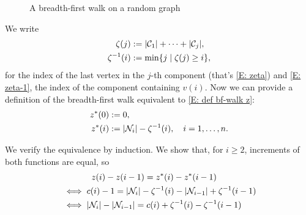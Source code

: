 \begin{figure}[H]
	\label{F: bf-walk}
	
	\centering
	\\
	
	\centering
	\\
	
	\centering
	
	\caption{A breadth-first walk on a random graph}
\end{figure} 


We write
\begin{align}
\zeta(j) &:= |\mathcal{C}_{1}| + \dots + |\mathcal{C}_{j}|, \label{E: zeta}\\ 
\zeta^{-1}(i) &:= \min \{ j \; | \; \zeta(j) \geq i \}, \label{E: zeta-1}
\end{align}
for the index of the last vertex in the $j$-th component (that's \eqref{E: zeta})
and \eqref{E: zeta-1}, the index of the component containing $v(i)$.
Now we can provide a definition of the breadth-first walk equivalent to \eqref{E: def bf-walk z}:
\begin{equation}  \label{E: def bf-walk z*}
\begin{aligned}
z^*(0) &:= 0, \\
z^*(i) &:= |\mathcal{N}_{i}| - \zeta^{-1}(i), \quad i=1, \dots , n.
\end{aligned}
\end{equation}

We verify the equivalence by induction.
We show that, for $i \geq 2$, increments of both functions are equal,
so
\begin{equation} \label{E: equality z z*}
\begin{aligned} 
&\hspace{35pt} z(i) - z(i-1) = z^*(i)  -z^*(i-1) \\
&\iff c(i) - 1 = |\mathcal{N}_{i}| - \zeta^{-1}(i) - |\mathcal{N}_{i-1}| + \zeta^{-1}(i-1) \\
&\iff |\mathcal{N}_{i}| - |\mathcal{N}_{i-1}| = c(i) + \zeta^{-1}(i) - \zeta^{-1}(i-1)
\end{aligned}
\end{equation}

